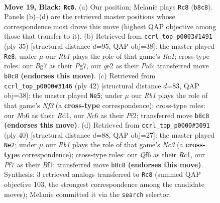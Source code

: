 \documentclass[11pt]{article}
\begin{document}
\clearpage

\begin{figure}[p]\centering
\begin{subfigure}{0.46\textwidth}\centering
\resizebox{\linewidth}{!}{%
\newchessgame
\chessboard[
  setfen={1r4k1/pp3pbp/1nn2qp1/3p1b2/3P1B2/1B5P/PPN1QPP1/RN4K1 b - - 4 19},
  showmover=false,
  pgfstyle=straightmove, color=movearrow, markmove={b8-c8}
]}
\caption{}
\end{subfigure}\hfill
\begin{subfigure}{0.46\textwidth}\centering
\resizebox{\linewidth}{!}{%
\newchessgame
\chessboard[
  setfen={r5k1/1p1q1pp1/p1n2nbp/3p4/N2P1BP1/5P2/PP4BP/2RQ2K1 b - - 2 18},
  showmover=false,
  pgfstyle=straightmove, color=movearrow, markmove={a8-e8}
]}
\caption{}
\end{subfigure}
\\[4pt]
\begin{subfigure}{0.46\textwidth}\centering
\resizebox{\linewidth}{!}{%
\newchessgame
\chessboard[
  setfen={2rq4/1bp2pbk/p5np/1p3p2/3P4/P1N1QNBP/1P3PP1/3R2K1 w - - 3 22},
  showmover=false,
  pgfstyle=straightmove, color=movearrow, markmove={f3-e5}
]}
\caption{}
\end{subfigure}\hfill
\begin{subfigure}{0.46\textwidth}\centering
\resizebox{\linewidth}{!}{%
\newchessgame
\chessboard[
  setfen={1q4k1/1b1r1ppp/2p2n2/pp2b3/4P3/2N1B2P/PPQ2PP1/2R2BK1 w - - 2 21},
  showmover=false,
  pgfstyle=straightmove, color=movearrow, markmove={c3-e2}
]}
\caption{}
\end{subfigure}
\caption{\textbf{Move 19, Black: \texttt{Rc8}.} (a) Our position; Melanie plays \texttt{Rc8} (\texttt{b8c8}). Panels (b)--(d) are the retrieved master positions whose correspondence most drove this move (highest QAP objective among those that transfer to it). (b) Retrieved from \texttt{ccrl\_top\_p0003\#1491} (ply 35) [structural distance $d$=95, QAP obj=38]: the master played \texttt{Re8}; under $\mu$ our \emph{Rb1} plays the role of that game's \emph{Ra1}; cross-type roles: our \emph{B}g7 as their \emph{P}g7, our \emph{q}e2 as their \emph{P}a6; transferred move \texttt{b8c8} \textbf{(endorses this move)}. (c) Retrieved from \texttt{ccrl\_top\_p0000\#3146} (ply 42) [structural distance $d$=83, QAP obj=38]: the master played \texttt{Ne5}; under $\mu$ our \emph{Rb1} plays the role of that game's \emph{Nf3} (a \textbf{cross-type} correspondence); cross-type roles: our \emph{N}b6 as their \emph{R}d1, our \emph{N}c6 as their \emph{P}f2; transferred move \texttt{b8c8} \textbf{(endorses this move)}. (d) Retrieved from \texttt{ccrl\_top\_p0000\#3091} (ply 40) [structural distance $d$=88, QAP obj=27]: the master played \texttt{Ne2}; under $\mu$ our \emph{Rb1} plays the role of that game's \emph{Nc3} (a \textbf{cross-type} correspondence); cross-type roles: our \emph{Q}f6 as their \emph{R}c1, our \emph{P}f7 as their \emph{B}f1; transferred move \texttt{b8c8} \textbf{(endorses this move)}. Synthesis: 3 retrieved analogs transferred to \texttt{Rc8} (summed QAP objective 103, the strongest correspondence among the candidate moves); Melanie committed it via the \texttt{search} selector.}
\label{fig:thought-m37}
\end{figure}
\end{document}
